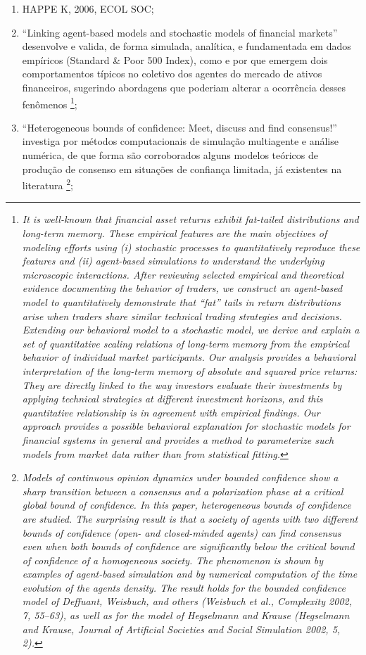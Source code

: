 \begin{enumerate}
\item HAPPE K, 2006, ECOL SOC;
\item ``Linking agent-based models and stochastic models of financial markets'' desenvolve e valida, de forma simulada, analítica, e fundamentada em dados empíricos (Standard \& Poor 500 Index), como e por que emergem dois comportamentos típicos no coletivo dos agentes do mercado de ativos financeiros, sugerindo abordagens que poderiam alterar a ocorrência desses fenômenos   \footnote{\textit{It is well-known that financial asset returns exhibit fat-tailed distributions and long-term memory. These empirical features are the main objectives of modeling efforts using (i) stochastic processes to quantitatively reproduce these features and (ii) agent-based simulations to understand the underlying microscopic interactions. After reviewing selected empirical and theoretical evidence documenting the behavior of traders, we construct an agent-based model to quantitatively demonstrate that “fat” tails in return distributions arise when traders share similar technical trading strategies and decisions. Extending our behavioral model to a stochastic model, we derive and explain a set of quantitative scaling relations of long-term memory from the empirical behavior of individual market participants. Our analysis provides a behavioral interpretation of the long-term memory of absolute and squared price returns: They are directly linked to the way investors evaluate their investments by applying technical strategies at different investment horizons, and this quantitative relationship is in agreement with empirical findings. Our approach provides a possible behavioral explanation for stochastic models for financial systems in general and provides a method to parameterize such models from market data rather than from statistical fitting.}};
\item ``Heterogeneous bounds of confidence: Meet, discuss and find consensus!'' investiga por métodos computacionais de simulação multiagente e análise numérica, de que forma são corroborados alguns modelos teóricos de produção de consenso em situações de confiança limitada, já existentes na literatura  \footnote{\textit{Models of continuous opinion dynamics under bounded confidence show a sharp transition between a consensus and a polarization phase at a critical global bound of confidence. In this paper, heterogeneous bounds of confidence are studied. The surprising result is that a society of agents with two different bounds of confidence (open- and closed-minded agents) can find consensus even when both bounds of confidence are significantly below the critical bound of confidence of a homogeneous society. The phenomenon is shown by examples of agent-based simulation and by numerical computation of the time evolution of the agents density. The result holds for the bounded confidence model of Deffuant, Weisbuch, and others (Weisbuch et al., Complexity 2002, 7, 55–63), as well as for the model of Hegselmann and Krause (Hegselmann and Krause, Journal of Artificial Societies and Social Simulation 2002, 5, 2).}};

\end{enumerate}
